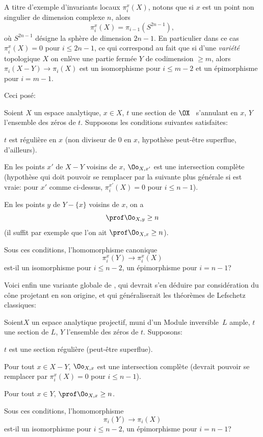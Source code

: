 A titre d'exemple d'invariants locaux $\pi_i^x(X)$, notons que si $x$ est un point non singulier de \ignorespaces dimension complexe $n$, alors\pageoriginale
$$
\pi_i^x(X)=\pi_{i-1}(S^{2n-1}),
$$
o\`u $S^{2n-1}$ d\'esigne la sph\`ere de dimension $2n-1$. En particulier dans ce cas $\pi_{i}^x(X)=0$ pour $i\le 2n-1$, ce qui correspond au fait que si d'une \emph{vari\'et\'e} topologique $X$ on enl\`eve une partie ferm\'ee $Y$ de codimension $\ge m$, alors $\pi_i(X-Y)\to \pi_i(X)$ est un isomorphisme pour $i\le m-2$ et un \'epimorphisme pour $i=m-1$.

Ceci pos\'e:

\begin{probleme} \label{XIII.4.2}
Soient $X$ un espace analytique, $x\in X$, $t$ une section de $\OX$ \ s'annulant en $x$, $Y$ l'ensemble des z\'eros de $t$. Supposons les conditions suivantes satisfaites:
\begin{enumeratea}
\item
$t$ est r\'eguli\`ere en $x$ (\ie non diviseur de $0$ en $x$, hypoth\`ese peut-\^etre superflue, d'ailleurs).
\item
En les points $x'$ de $X-Y$ voisins de $x$, $\Oo_{X, x'}$ est une intersection compl\`ete (hypoth\`ese qui doit pouvoir se remplacer par la suivante plus g\'en\'erale si  est vraie: pour $x'$ comme ci-dessus, $\pi_i^{x'}(X)=0$ pour $i\le n-1$).
\item
En les points $y$ de $Y-\{ x\}$ voisins de $x$, on a
$$
\prof \Oo_{X, y}\ge n$$
(il suffit par exemple que l'on ait $\prof\Oo_{X, x}\ge n$).
\end{enumeratea}

Sous ces conditions, l'homomorphisme canonique
$$
\pi_i^x(Y)\to \pi_i^x(X)$$
est-il un isomorphisme pour $i\le n-2$, un \'epimorphisme pour $i=n-1$?
\end{probleme}

Voici enfin une variante globale de , qui devrait s'en d\'eduire par consid\'eration du c\^{o}ne projetant en son origine, et qui g\'en\'eraliserait les th\'eor\`emes de Lefschetz classiques:

\begin{probleme} \label{XIII.4.3}
Soient\pageoriginale $X$ un espace analytique projectif, muni d'un Module inversible~$L$ ample, $t$ une section de $L$, $Y$ l'ensemble des z\'eros de $t$. Supposons:
\begin{enumeratea}
\item
$t$ est une section r\'eguli\`ere (\ignorespaces peut-\^etre superflue).
\item
Pour tout $x\in X-Y$, $\Oo_{X, x}$ est une intersection compl\`ete (devrait pouvoir se remplacer par $\pi_i^{x}(X)=0$ pour $i\le n-1$).
\item
Pour tout $x\in Y$, $\prof \Oo_{X, x}\ge n$.
\end{enumeratea}

Sous ces conditions, l'homomorphisme
$$
\pi_i(Y)\to \pi_i(X)$$
est-il un isomorphisme pour $i\le n-2$, un \'epimorphisme pour $i=n-1$?
\end{probleme}

